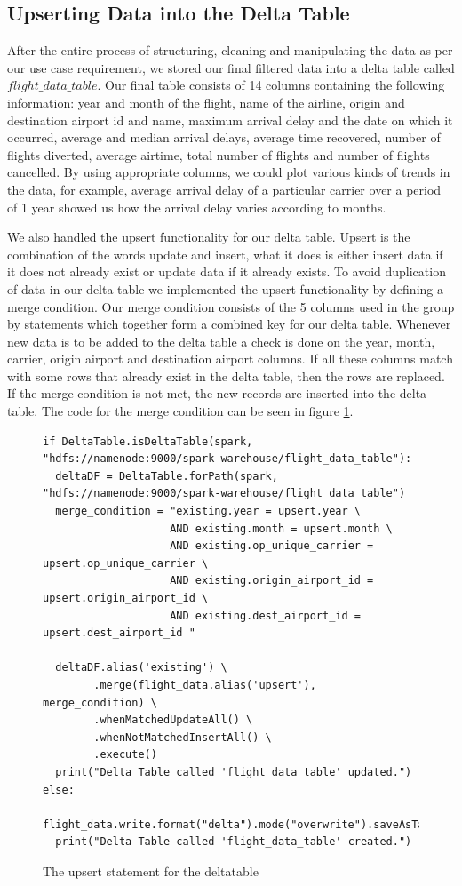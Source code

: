 \subsection{Upserting Data into the Delta Table}
After the entire process of structuring, cleaning and manipulating the data as per our use case requirement, we stored our final filtered data into a delta table called $flight\_data\_table$. Our final table consists of 14 columns containing the following information: year and month of the flight, name of the airline, origin and destination airport id and name, maximum arrival delay and the date on which it occurred, average and median arrival delays, average time recovered, number of flights diverted, average airtime, total number of flights and number of flights cancelled. By using appropriate columns, we could plot various kinds of trends in the data, for example, average arrival delay of a particular carrier over a period of 1 year showed us how the arrival delay varies according to months.

We also handled the upsert functionality for our delta table. Upsert is the combination of the words update and insert, what it does is either insert data if it does not already exist or update data if it already exists. To avoid duplication of data in our delta table we implemented the upsert functionality by defining a merge condition. Our merge condition consists of the 5 columns used in the group by statements which together form a combined key for our delta table. Whenever new data is to be added to the delta table a check is done on the year, month, carrier, origin airport and destination airport columns. If all these columns match with some rows that already exist in the delta table, then the rows are replaced. If the merge condition is not met, the new records are inserted into the delta table. The code for the merge condition can be seen in figure \ref{fig:delta_upsert}.

\begin{figure}
\centering
\begin{lstlisting}
if DeltaTable.isDeltaTable(spark, "hdfs://namenode:9000/spark-warehouse/flight_data_table"):
  deltaDF = DeltaTable.forPath(spark, "hdfs://namenode:9000/spark-warehouse/flight_data_table")
  merge_condition = "existing.year = upsert.year \
                    AND existing.month = upsert.month \
                    AND existing.op_unique_carrier = upsert.op_unique_carrier \
                    AND existing.origin_airport_id = upsert.origin_airport_id \
                    AND existing.dest_airport_id = upsert.dest_airport_id "

  deltaDF.alias('existing') \
        .merge(flight_data.alias('upsert'), merge_condition) \
        .whenMatchedUpdateAll() \
        .whenNotMatchedInsertAll() \
        .execute()
  print("Delta Table called 'flight_data_table' updated.")  
else:
  flight_data.write.format("delta").mode("overwrite").saveAsTable("flight_data_table")
  print("Delta Table called 'flight_data_table' created.")
\end{lstlisting}
\caption{The upsert statement for the deltatable}
\label{fig:delta_upsert}
\end{figure}

